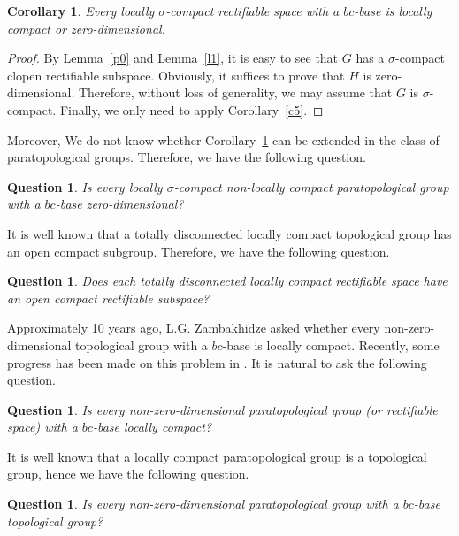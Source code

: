 \documentclass[psamsfonts,fceqn,leqno]{amsart}
\newtheorem{corollary}[theorem]{Corollary}
\newtheorem{question}[theorem]{Question}
\theoremstyle{definition}
\begin{document}
\begin{corollary}\label{c4}
Every locally $\sigma$-compact rectifiable space with a $bc$-base is
locally compact or zero-dimensional.
\end{corollary}

\begin{proof}
 By Lemma~\ref{p0} and Lemma~\ref{l1}, it is easy to see that $G$ has a $\sigma$-compact clopen rectifiable subspace. Obviously, it suffices to prove that $H$ is zero-dimensional. Therefore, without loss of generality, we may assume that $G$ is $\sigma$-compact. Finally, we only need to apply Corollary~\ref{c5}.
\end{proof}

Moreover, We do not know whether Corollary~\ref{c4} can be extended in the class of paratopological groups. Therefore, we have the following question.

\begin{question}
Is every locally $\sigma$-compact non-locally compact paratopological group with a $bc$-base
zero-dimensional?
\end{question}

It is well known that a totally disconnected locally compact topological group has an open compact subgroup. Therefore, we have the following question.

\begin{question}\label{q3}
Does each totally disconnected locally compact rectifiable space have an open compact rectifiable subspace?
\end{question}

Approximately 10 years ago, L.G. Zambakhidze asked whether every non-zero-dimensional topological group with a $bc$-base is locally compact. Recently, some progress has been made on this problem in \cite{A2014}. It is natural to ask the following question.

\begin{question}
Is every non-zero-dimensional paratopological group (or rectifiable space) with a $bc$-base locally compact?
\end{question}

It is well known that a locally compact paratopological group is a topological group, hence we have the following question.

\begin{question}
Is every non-zero-dimensional paratopological group with a $bc$-base topological group?
\end{question}
\end{document}
